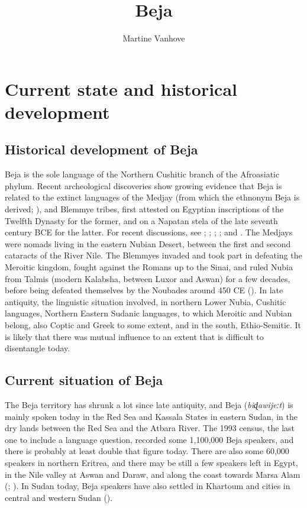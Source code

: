 \documentclass[output=paper]{langsci/langscibook}
\author{Martine Vanhove\affiliation{LLACAN (CNRS, INALCO)}}
\title{Beja}
\begin{document}
\maketitle 
  


 \section{Current state and historical development}


 \subsection{Historical development of Beja}


Beja is the sole language of the Northern Cushitic branch of the Afroasiatic phylum. Recent archeological discoveries show growing evidence that Beja is related to the extinct languages of the Medjay (from which the ethnonym Beja is derived; \citealt[1175]{Rilly2014}), and Blemmye tribes, first attested on Egyptian inscriptions of the Twelfth Dynasty for the former, and on a Napatan stela of the late seventh century BCE for the latter. For recent discussions, see \citet{Browne2003}; \citet{El-Sayed2011}; \citet{Zibelius-Chen2014}; \citet{Rilly2014}; and \citet{Rilly2018}. The Medjays were nomads living in the eastern Nubian Desert, between the first and second cataracts of the River Nile. The Blemmyes invaded and took part in defeating the Meroitic kingdom, fought against the Romans up to the Sinai, and ruled Nubia from Talmis (modern Kalabsha, between Luxor and Aswan) for a few decades, before being defeated themselves by the Noubades around 450 CE (\citealt{Rilly2018}). In late antiquity, the linguistic situation involved, in northern Lower Nubia, Cushitic languages, Northern Eastern Sudanic languages, to which Meroitic and Nubian belong, also Coptic and Greek to some extent, and in the south, Ethio-Semitic. It is likely that there was mutual influence to an extent that is difficult to disentangle today. 


 
 \subsection{Current situation of Beja}


The Beja territory has shrunk a lot since late antiquity, and Beja (\textit{biɖawijeːt}) is mainly spoken today in the Red Sea and Kassala States in eastern Sudan, in the dry lands between the Red Sea and the Atbara River. The 1993 census, the last one to include a language question, recorded some 1,100,000 Beja speakers, and there is probably at least double that figure today. There are also some 60,000 speakers in northern Eritrea, and there may be still a few speakers left in Egypt, in the Nile valley at Aswan and Daraw, and along the coast towards Marsa Alam (\citealt{Morin1995}; \citealt{Wedekind2012}). In Sudan today, Beja speakers have also settled in Khartoum and cities in central and western Sudan (\citealt[67]{HamidAhmed2005book}).
\end{document}
